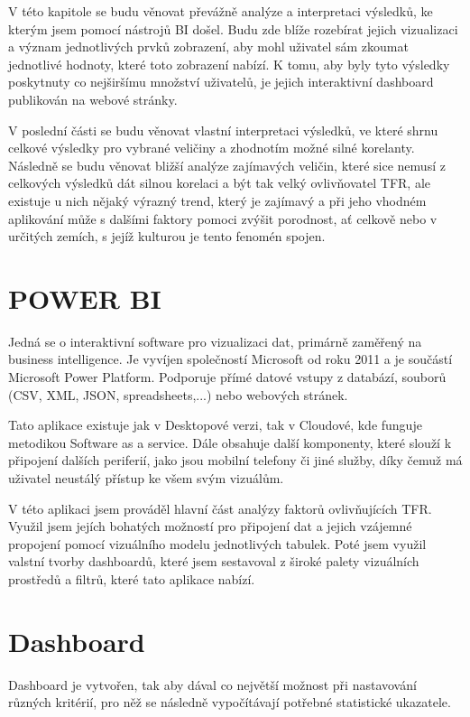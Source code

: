 \documentclass[thesis=M,czech]{FITthesis}[2022/10/08]
\begin{document}
V této kapitole se budu věnovat převážně analýze a interpretaci výsledků, ke kterým jsem pomocí nástrojů BI došel. Budu zde blíže rozebírat jejich vizualizaci a význam jednotlivých prvků zobrazení, aby mohl uživatel sám zkoumat jednotlivé hodnoty, které toto zobrazení nabízí. K tomu, aby byly tyto výsledky poskytnuty co nejširšímu množství uživatelů, je jejich interaktivní dashboard publikován na webové stránky.

V poslední části se budu věnovat vlastní interpretaci výsledků, ve které shrnu celkové výsledky pro vybrané veličiny a zhodnotím možné silné korelanty. Následně se budu věnovat bližší analýze zajímavých veličin, které sice nemusí z celkových výsledků dát silnou korelaci a být tak velký ovlivňovatel TFR, ale existuje u nich nějaký výrazný trend, který je zajímavý a při jeho vhodném aplikování může s dalšími faktory pomoci zvýšit porodnost, ať celkově nebo v určitých zemích, s jejíž kulturou je tento fenomén spojen.


\section{POWER BI}

Jedná se o interaktivní software pro vizualizaci dat, primárně zaměřený na business intelligence. Je vyvíjen společností Microsoft od roku 2011 a je součástí Microsoft Power Platform. Podporuje přímé datové vstupy z databází, souborů (CSV, XML, JSON, spreadsheets,...) nebo webových stránek. 

Tato aplikace existuje jak v Desktopové verzi, tak v Cloudové, kde funguje metodikou Software as a service. Dále obsahuje další komponenty, které slouží k připojení dalších periferií, jako jsou mobilní telefony či jiné služby, díky čemuž má uživatel neustálý přístup ke všem svým vizuálům.

V této aplikaci jsem prováděl hlavní část analýzy faktorů ovlivňujících TFR. Využil jsem jejích bohatých možností pro připojení dat a jejich vzájemné propojení pomocí vizuálního modelu jednotlivých tabulek. Poté jsem využil valstní tvorby dashboardů, které jsem sestavoval z široké palety vizuálních prostředů a filtrů, které tato aplikace nabízí.

\section{Dashboard}

Dashboard je vytvořen, tak aby dával co největší možnost při nastavování různých kritérií, pro něž se následně vypočítávají potřebné statistické ukazatele.
\end{document}
